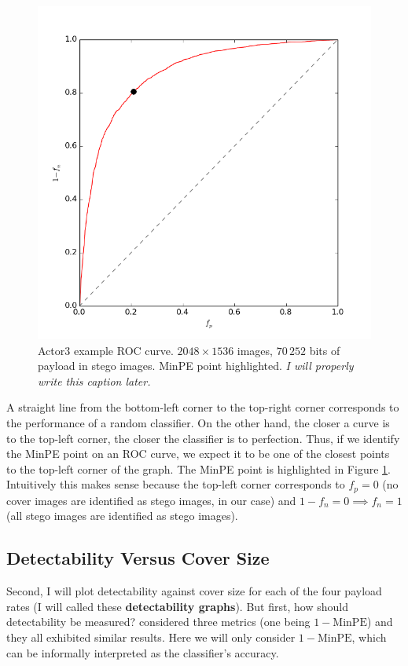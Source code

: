 \documentclass[11pt,a4paper,twoside,openright]{report}
\begin{document}
\begin{figure}[htbp]
	\begin{center}
		\includegraphics[width=0.5\linewidth]{actor3_size2048_70252b_roc.png}
		\caption{Actor3 example ROC curve. $2048\times1536$ images, $70\,252$ bits of payload in stego images. MinPE point highlighted. \textit{I will properly write this caption later.}}
		\label{fig:actor3-roc-example}
	\end{center}
\end{figure}

A straight line from the bottom-left corner to the top-right corner corresponds to the performance of a random classifier. On the other hand, the closer a curve is to the top-left corner, the closer the classifier is to perfection. Thus, if we identify the MinPE point on an ROC curve, we expect it to be one of the closest points to the top-left corner of the graph. The MinPE point is highlighted in Figure \ref{fig:actor3-roc-example}. Intuitively this makes sense because the top-left corner corresponds to $f_p = 0$ (no cover images are identified as stego images, in our case) and $1-f_n = 0 \implies f_n = 1$ (all stego images are identified as stego images).


\subsection{Detectability Versus Cover Size}

Second, I will plot detectability against cover size for each of the four payload rates (I will called these \textbf{detectability graphs}). But first, how should detectability be measured? \cite{2008-paper} considered three metrics (one being $1 - \text{MinPE}$) and they all exhibited similar results. Here we will only consider $1 - \text{MinPE}$, which can be informally interpreted as the classifier's accuracy.
\end{document}
